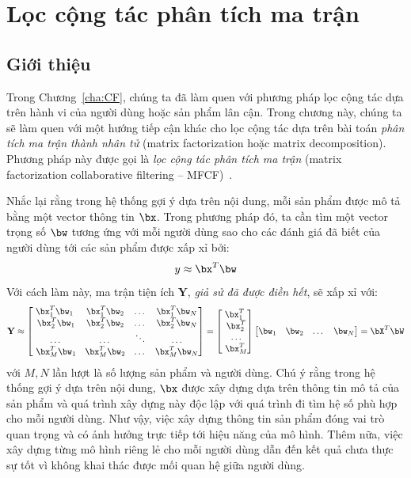 \chapter{Lọc cộng tác phân tích ma trận}
\label{cha:matrix_factorization}
\section{Giới thiệu }
Trong Chương~\ref{cha:CF}, chúng ta đã làm quen với phương pháp
lọc cộng tác dựa trên hành vi của người dùng hoặc sản phẩm lân cận. Trong chương này, chúng ta sẽ làm quen với một hướng
tiếp cận khác cho lọc cộng tác dựa trên bài toán
\textit{phân tích ma trận thành nhân tử} ({matrix factorization} hoặc
{matrix decomposition}). Phương pháp này được gọi
là \textit{lọc cộng tác phân tích ma trận} ({matrix factorization collaborative filtering} -- MFCF)~\cite{koren2009matrix}.

Nhắc lại rằng trong hệ thống gợi ý dựa trên nội dung, mỗi sản phẩm được
mô tả bằng một vector thông tin $\bx$. Trong phương pháp
đó, ta cần tìm một vector trọng số $\bw$ tương ứng với mỗi người dùng sao cho các đánh giá đã biết của người dùng tới các sản phẩm được xấp xỉ bởi:
\begin{equation} 
y \approx \bx^T\bw
\end{equation} 
Với cách làm này, ma trận tiện ích $\mathbf{Y}$, \textit{giả sử đã được điền
hết}, sẽ xấp xỉ với:
\begin{equation} 
    \mathbf{Y} \approx \left[ \begin{matrix} \bx^T_1\bw_1 &
    \bx^T_1\bw_2 & \dots & \bx^T_1 \bw_N\\\
    \bx^T_2\bw_1 & \bx^T_2\bw_2 & \dots &
    \bx^T_2 \bw_N\\\ \dots & \dots & \ddots & \dots \\\
    \bx^T_M\bw_1 & \bx^T_M\bw_2 & \dots & \bx^T_M \bw_N \end{matrix} \right] = \left[ \begin{matrix} \bx^T_1 \\\ \bx^T_2 \\\ \dots \\\ \bx^T_M  \end{matrix} \right] 
    \left[ \begin{matrix} \bw_1 & \bw_2 & \dots & \bw_N \end{matrix} \right] = \bX^T\bW 
\end{equation} 
với $M, N$ lần lượt là số lượng sản phẩm và người dùng. Chú ý rằng trong
hệ thống gợi ý dựa trên nội dung, $\bx$ được xây dựng dựa trên thông
tin mô tả của sản phẩm và quá trình xây dựng này độc lập với quá trình đi
tìm hệ số phù hợp cho mỗi người dùng. Như vậy, việc xây dựng thông tin sản phẩm đóng vai trò quan trọng và có ảnh hưởng trực tiếp tới hiệu năng của
mô hình. Thêm nữa, việc xây dựng từng mô hình riêng lẻ cho mỗi người dùng dẫn
đến kết quả chưa thực sự tốt vì không khai thác được mối quan hệ giữa
người dùng.
 
